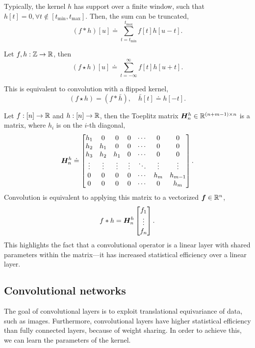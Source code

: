 Typically, the kernel $h$ has support over a finite window, such that $h[t] = 0, \forall t \not\in
    [t_{\min}, t_{\max}]$. Then, the sum can be truncated, \[
    (f * h)[u] \doteq \sum_{t=t_{\min}}^{t_{\max}} f[t] h[u-t].
\]

\begin{definition}
    Let $f,h: \mathbb{Z} \to \mathbb{R}$, then \[
        (f \star h)[u] \doteq \sum_{t=-\infty}^{\infty} f[t] h[u+t].
    \]
\end{definition}

\begin{remark}
    This is equivalent to convolution with a flipped kernel, \[
        (f \star h) = (f * \bar{h}), \quad \bar{h}[t] \doteq h[-t].
    \]
\end{remark}

Let $f: [n] \to \mathbb{R}$ and $h: [n] \to \mathbb{R}$, then the Toeplitz matrix $\bm{H}_n^h \in \mathbb{R}^{(n + m - 1)
        \times n}$ is a matrix, where $h_i$ is on the $i$-th diagonal, \[
    \bm{H}_n^h \doteq \begin{bmatrix}
        h_1    & 0      & 0      & 0      & \cdots & 0      & 0       \\
        h_2    & h_1    & 0      & 0      & \cdots & 0      & 0       \\
        h_3    & h_2    & h_1    & 0      & \cdots & 0      & 0       \\
        \vdots & \vdots & \vdots & \vdots & \ddots & \vdots & \vdots  \\
        0      & 0      & 0      & 0      & \cdots & h_m    & h_{m-1} \\
        0      & 0      & 0      & 0      & \cdots & 0      & h_m
    \end{bmatrix}.
\]
Convolution is equivalent to applying this matrix to a vectorized $\bm{f} \in \mathbb{R}^n$, \[
    f * h = \bm{H}_n^h \begin{bmatrix} f_1 \\ \vdots \\ f_n \end{bmatrix}.
\]
This highlights the fact that a convolutional operator is a linear layer with shared parameters
within the matrix---it has increased statistical efficiency over a linear layer.

\subsection{Convolutional networks}

The goal of convolutional layers is to exploit translational equivariance of data, such as images.
Furthermore, convolutional layers have higher statistical efficiency than fully connected layers,
because of weight sharing. In order to achieve this, we can learn the parameters of the kernel.

